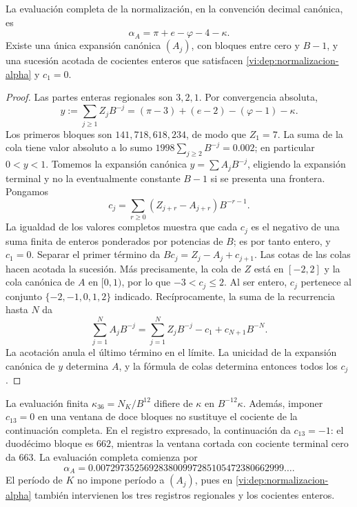\begin{theorem}
\label{vi:dep:alpha-completa}
La evaluación completa de la normalización, en la convención decimal
canónica, es
\begin{equation}
 \alpha_A=\pi+e-\varphi-4-\kappa.
 \label{vi:dep:alpha-A}
\end{equation}
Existe una única expansión canónica \((A_j)\), con bloques entre cero
y \(B-1\), y una sucesión acotada de cocientes enteros que satisfacen
\eqref{vi:dep:normalizacion-alpha} y \(c_1=0\).
\end{theorem}
\begin{proof}
Las partes enteras regionales son \(3,2,1\). Por convergencia absoluta,
\[
 y:=\sum_{j\ge1}Z_jB^{-j}
   =(\pi-3)+(e-2)-(\varphi-1)-\kappa.
\]
Los primeros bloques son \(141,718,618,234\), de modo que
\(Z_1=7\). La suma de la cola tiene valor absoluto a lo sumo
\(1998\sum_{j\ge2}B^{-j}=0.002\); en particular \(0<y<1\).
Tomemos la expansión canónica \(y=\sum A_jB^{-j}\), eligiendo la
expansión terminal y no la eventualmente constante \(B-1\) si se
presenta una frontera. Pongamos
\[
 c_j=\sum_{r\ge0}(Z_{j+r}-A_{j+r})B^{-r-1}.
\]
La igualdad de los valores completos muestra que cada \(c_j\) es el
negativo de una suma finita de enteros ponderados por potencias de
\(B\); es por tanto entero, y \(c_1=0\). Separar el primer término
da \(Bc_j=Z_j-A_j+c_{j+1}\). Las cotas de las colas hacen acotada
la sucesión. Más precisamente, la cola de \(Z\) está en \([-2,2]\)
y la cola canónica de \(A\) en \([0,1)\), por lo que
\(-3<c_j\le2\). Al ser entero, \(c_j\) pertenece al conjunto
\(\{-2,-1,0,1,2\}\) indicado.
Recíprocamente, la suma de la recurrencia hasta \(N\) da
\[
 \sum_{j=1}^N A_jB^{-j}
 =\sum_{j=1}^N Z_jB^{-j}-c_1+c_{N+1}B^{-N}.
\]
La acotación anula el último término en el límite. La unicidad de la
expansión canónica de \(y\) determina \(A\), y la fórmula de colas
determina entonces todos los \(c_j\).
\end{proof}

La evaluación finita \(\kappa_{36}=N_K/B^{12}\) difiere de
\(\kappa\) en \(B^{-12}\kappa\). Además, imponer
\(c_{13}=0\) en una ventana de doce bloques no sustituye el cociente
de la continuación completa. En el registro expresado, la continuación
da \(c_{13}=-1\): el duodécimo bloque es \(662\), mientras la
ventana cortada con cociente terminal cero da \(663\). La evaluación
completa comienza por
\[
 \alpha_A=0.007297352569283800997285105472380662999\ldots.
\]
El período de \(K\) no impone período a \((A_j)\), pues en
\eqref{vi:dep:normalizacion-alpha} también intervienen los tres
registros regionales y los cocientes enteros.

